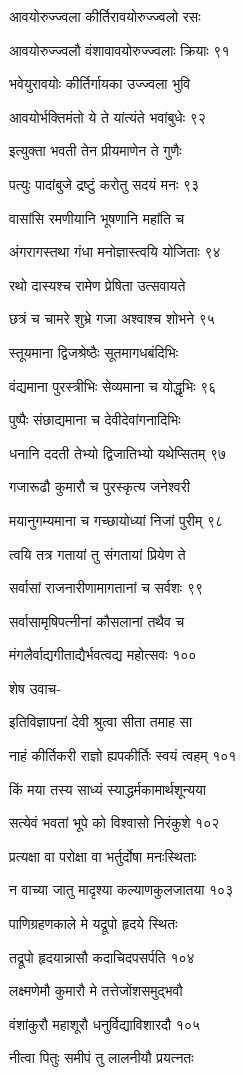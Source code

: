 आवयोरुज्ज्वला कीर्तिरावयोरुज्ज्वलो रसः

आवयोरुज्ज्वलौ वंशावावयोरुज्ज्वलाः क्रियाः ९१

भवेयुरावयोः कीर्तिर्गायका उज्ज्वला भुवि

आवयोर्भक्तिमंतो ये ते यांत्यंते भवांबुधेः ९२

इत्युक्ता भवती तेन प्रीयमाणेन ते गुणैः

पत्युः पादांबुजे द्रष्टुं करोतु सदयं मनः ९३

वासांसि रमणीयानि भूषणानि महांति च

अंगरागस्तथा गंधा मनोज्ञास्त्वयि योजिताः ९४

रथो दास्यश्च रामेण प्रेषिता उत्सवायते

छत्रं च चामरे शुभ्रे गजा अश्वाश्च शोभने ९५

स्तूयमाना द्विजश्रेष्ठैः सूतमागधबंदिभिः

वंद्यमाना पुरस्त्रीभिः सेव्यमाना च योद्धृभिः ९६

पुष्पैः संछाद्यमाना च देवीदेवांगनादिभिः

धनानि ददती तेभ्यो द्विजातिभ्यो यथेप्सितम् ९७

गजारूढौ कुमारौ च पुरस्कृत्य जनेश्वरी

मयानुगम्यमाना च गच्छायोध्यां निजां पुरीम् ९८

त्वयि तत्र गतायां तु संगतायां प्रियेण ते

सर्वासां राजनारीणामागतानां च सर्वशः ९९

सर्वासामृषिपत्नीनां कौसलानां तथैव च

मंगलैर्वाद्यगीताद्यैर्भवत्वद्य महोत्सवः १००

शेष उवाच-

इतिविज्ञापनां देवी श्रुत्वा सीता तमाह सा

नाहं कीर्तिकरी राज्ञो ह्यपकीर्तिः स्वयं त्वहम् १०१

किं मया तस्य साध्यं स्याद्धर्मकामार्थशून्यया

सत्येवं भवतां भूपे को विश्वासो निरंकुशे १०२

प्रत्यक्षा वा परोक्षा वा भर्तुर्दोषा मनःस्थिताः

न वाच्या जातु मादृश्या कल्याणकुलजातया १०३

पाणिग्रहणकाले मे यद्रूपो हृदये स्थितः

तद्रूपो हृदयान्नासौ कदाचिदपसर्पति १०४

लक्ष्मणेमौ कुमारौ मे तत्तेजोंशसमुद्भवौ

वंशांकुरौ महाशूरौ धनुर्विद्याविशारदौ १०५

नीत्वा पितुः समीपं तु लालनीयौ प्रयत्नतः

